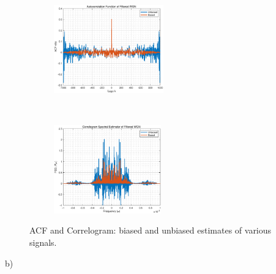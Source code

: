\begin{figure}[H]
\begin{subfigure}{0.35\textwidth}
    \end{subfigure}
    ~
    ~
    \begin{subfigure}{0.35\textwidth}
        \centering
        \includegraphics[height=1.5in]{Part1/1_3_a_wgn1.eps}
    \end{subfigure}
    ~
    \begin{subfigure}{0.35\textwidth}
        \centering
        \includegraphics[height=1.5in]{Part1/1_3_a_wgn2.eps}
    \end{subfigure}
    \caption{ACF and Correlogram: biased and unbiased estimates of various signals.}
    \label{fig:1_3_a}
\end{figure}

b)

